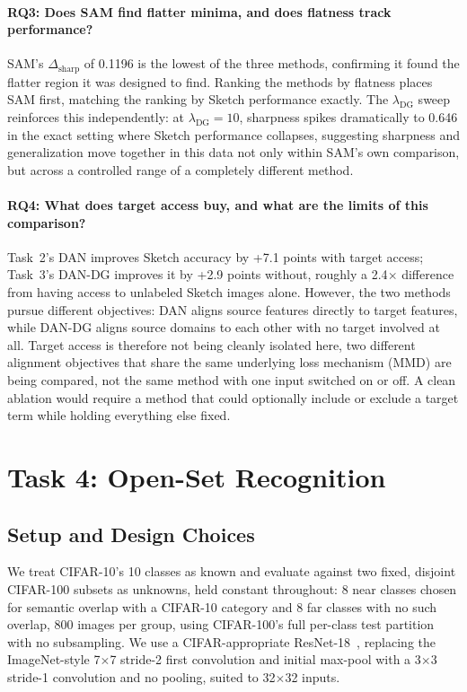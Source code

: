 \documentclass{article}
\begin{document}
\paragraph{RQ3: Does SAM find flatter minima, and does flatness track performance?}

SAM's $\Delta_\text{sharp}$ of 0.1196 is the lowest of the three methods, confirming it found the flatter region it was designed to find. Ranking the methods by flatness places SAM first, matching the ranking by Sketch performance exactly. The $\lambda_\text{DG}$ sweep reinforces this independently: at $\lambda_\text{DG}=10$, sharpness spikes dramatically to 0.646 in the exact setting where Sketch performance collapses, suggesting sharpness and generalization move together in this data not only within SAM's own comparison, but across a controlled range of a completely different method.

\paragraph{RQ4: What does target access buy, and what are the limits of this comparison?}

Task~2's DAN improves Sketch accuracy by +7.1 points with target access; Task~3's DAN-DG improves it by +2.9 points without, roughly a 2.4$\times$ difference from having access to unlabeled Sketch images alone. However, the two methods pursue different objectives: DAN aligns source features directly to target features, while DAN-DG aligns source domains to each other with no target involved at all. Target access is therefore not being cleanly isolated here, two different alignment objectives that share the same underlying loss mechanism (MMD) are being compared, not the same method with one input switched on or off. A clean ablation would require a method that could optionally include or exclude a target term while holding everything else fixed.
\section{Task 4: Open-Set Recognition}
\label{sec:task4}

\subsection{Setup and Design Choices}

We treat CIFAR-10's 10 classes as known and evaluate against two fixed, disjoint CIFAR-100 subsets as unknowns, held constant throughout: 8 near classes chosen for semantic overlap with a CIFAR-10 category and 8 far classes with no such overlap, 800 images per group, using CIFAR-100's full per-class test partition with no subsampling. We use a CIFAR-appropriate ResNet-18~\citep{he2016resnet}, replacing the ImageNet-style 7$\times$7 stride-2 first convolution and initial max-pool with a 3$\times$3 stride-1 convolution and no pooling, suited to 32$\times$32 inputs.
\end{document}

